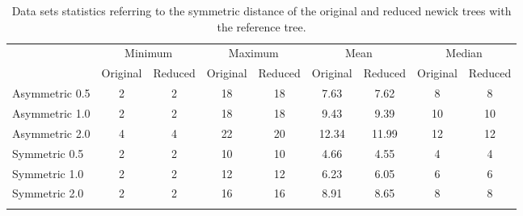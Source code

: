 \documentclass[12pt]{article}
\begin{document}
\begin{table}[H]
	\small\addtolength{\tabcolsep}{-5pt}
	\begin{tabular}{lcccccccc}
		\cline{2-9}
		\multicolumn{1}{c|}{\textbf{}} & \multicolumn{2}{c|}{Minimum} & \multicolumn{2}{c|}{Maximum} & \multicolumn{2}{c|}{Mean} & \multicolumn{2}{c|}{Median} \\ \cline{2-9} 
		\multicolumn{1}{l|}{\textbf{}} & \multicolumn{1}{l|}{Original} & \multicolumn{1}{l|}{Reduced} & \multicolumn{1}{l|}{Original} & \multicolumn{1}{l|}{Reduced} & \multicolumn{1}{l|}{Original} & \multicolumn{1}{l|}{Reduced} & \multicolumn{1}{l|}{Original} & \multicolumn{1}{l|}{Reduced} \\ \hline
		\multicolumn{1}{|l|}{Asymmetric 0.5} & \multicolumn{1}{c|}{2} & \multicolumn{1}{c|}{2} & \multicolumn{1}{c|}{18} & \multicolumn{1}{c|}{18} & \multicolumn{1}{c|}{7.63} & \multicolumn{1}{c|}{7.62} & \multicolumn{1}{c|}{8} & \multicolumn{1}{c|}{8} \\ \hline
		\multicolumn{1}{|l|}{Asymmetric 1.0} & \multicolumn{1}{c|}{2} & \multicolumn{1}{c|}{2} & \multicolumn{1}{c|}{18} & \multicolumn{1}{c|}{18} & \multicolumn{1}{c|}{9.43} & \multicolumn{1}{c|}{9.39} & \multicolumn{1}{c|}{10} & \multicolumn{1}{c|}{10} \\ \hline
		\multicolumn{1}{|l|}{Asymmetric 2.0} & \multicolumn{1}{c|}{4} & \multicolumn{1}{c|}{4} & \multicolumn{1}{c|}{22} & \multicolumn{1}{c|}{20} & \multicolumn{1}{c|}{12.34} & \multicolumn{1}{c|}{11.99} & \multicolumn{1}{c|}{12} & \multicolumn{1}{c|}{12} \\ \hline
		\multicolumn{1}{|l|}{Symmetric 0.5} & \multicolumn{1}{c|}{2} & \multicolumn{1}{c|}{2} & \multicolumn{1}{c|}{10} & \multicolumn{1}{c|}{10} & \multicolumn{1}{c|}{4.66} & \multicolumn{1}{c|}{4.55} & \multicolumn{1}{c|}{4} & \multicolumn{1}{c|}{4} \\ \hline
		\multicolumn{1}{|l|}{Symmetric 1.0} & \multicolumn{1}{c|}{2} & \multicolumn{1}{c|}{2} & \multicolumn{1}{c|}{12} & \multicolumn{1}{c|}{12} & \multicolumn{1}{c|}{6.23} & \multicolumn{1}{c|}{6.05} & \multicolumn{1}{c|}{6} & \multicolumn{1}{c|}{6} \\ \hline
		\multicolumn{1}{|l|}{Symmetric 2.0} & \multicolumn{1}{c|}{2} & \multicolumn{1}{c|}{2} & \multicolumn{1}{c|}{16} & \multicolumn{1}{c|}{16} & \multicolumn{1}{c|}{8.91} & \multicolumn{1}{c|}{8.65} & \multicolumn{1}{c|}{8} & \multicolumn{1}{c|}{8} \\ \hline
		& \multicolumn{1}{l}{} & \multicolumn{1}{l}{} & \multicolumn{1}{l}{} & \multicolumn{1}{l}{} & \multicolumn{1}{l}{} & \multicolumn{1}{l}{} & \multicolumn{1}{l}{} & \multicolumn{1}{l}{}
	\end{tabular}
	\caption{Data sets statistics referring to the symmetric distance of the original and reduced newick trees with the reference tree.}
	\label{table:statistics}
\end{table}
\end{document}
